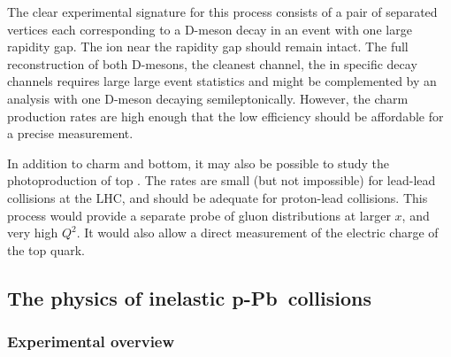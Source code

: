 \documentclass[../report.tex]{subfiles}
\begin{document}
The clear experimental signature for this process consists of a pair of separated vertices each corresponding to a D-meson decay  in an event with one large rapidity gap. The ion near the rapidity gap should remain intact. The full reconstruction of both D-mesons, the cleanest channel, the  in specific decay channels requires large large event statistics and might be complemented by an analysis with one D-meson decaying semileptonically.  However, the charm production rates are high enough that the low efficiency should be affordable for a precise measurement.

In addition to charm and bottom, it may also be possible to study the photoproduction of top \cite{Klein:2000dk,Goncalves:2013oga}.   The rates are small (but not impossible) for lead-lead collisions at the LHC, and should be adequate for proton-lead collisions. This process would provide a separate probe of gluon distributions at larger $x$, and very high $Q^2$.  It would also allow a direct measurement of the electric charge of the top quark. 

\newpage


\subsection{The physics of inelastic p-Pb~collisions}
\label{sec:pPbex}

\subsubsection{Experimental overview} %
\end{document}
